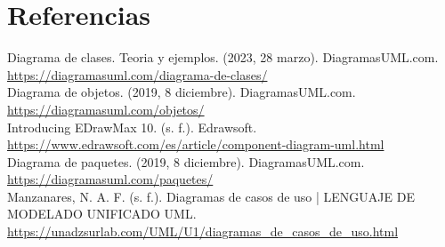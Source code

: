 \documentclass[12pt]{article}
\begin{document}
  \section*{Referencias}
  Diagrama de clases. Teoria y ejemplos. (2023, 28 marzo). DiagramasUML.com. \url{https://diagramasuml.com/diagrama-de-clases/} \\

  Diagrama de objetos. (2019, 8 diciembre). DiagramasUML.com. \url{https://diagramasuml.com/objetos/} \\

  Introducing EDrawMax 10. (s. f.). Edrawsoft. \url{https://www.edrawsoft.com/es/article/component-diagram-uml.html} \\

  Diagrama de paquetes. (2019, 8 diciembre). DiagramasUML.com. \url{https://diagramasuml.com/paquetes/} \\

  Manzanares, N. A. F. (s. f.). Diagramas de casos de uso | LENGUAJE DE MODELADO UNIFICADO UML. \url{https://unadzsurlab.com/UML/U1/diagramas_de_casos_de_uso.html}
\end{document}
